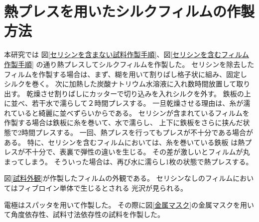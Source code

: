 \documentclass[dvipdfmx,12pt,a4paper]{jreport}
\begin{document}
		\section{熱プレスを用いたシルクフィルムの作製方法}
		本研究では
		図\ref{セリシンを含まない試料作製手順}、図\ref{セリシンを含むフィルム作製手順}
		の通り熱プレスしてシルクフィルムを作製した。
		セリシンを除去したフィルムを作製する場合は、まず、糊を用いて割りばし格子状に組み、固定し
		シルクを巻く。
		次に加熱した炭酸ナトリウム水溶液に入れ数時間放置して取り出す。
		乾燥させ割りばしにカッターで切り込みを入れシルクを外す。
		鉄板の上に並べ、若干水で濡らして２時間プレスする。
		一旦乾燥させる理由は、糸が濡れていると綺麗に並べずらいからである。
		セリシンが含まれているフィルムを作製する場合は鉄板に糸を巻いて、水で濡らし、
		上下に鉄板をさらに挟んだ状態で2時間プレスする。
		一回、熱プレスを行ってもプレスが不十分である場合がある。
		特に、セリシンを含むフィルムにおいては、糸を巻いている鉄板
		は熱プレスが不十分で、表裏で弾性の違いを生じる。
		その差が激しいとフィルムが丸まってしまう。
		そういった場合は、再び水に濡らし1枚の状態で熱プレスする。

		図\ref{試料外観}が作製したフィルムの外観である。
		セリシンなしのフィルムにおいてはフィブロイン単体で生じるとされる
		光沢が見られる。

		電極はスパッタを用いて作製した。
		その際に図\ref{金属マスク}の金属マスクを用いて角度依存性、試料寸法依存性の試料を作製した。
\end{document}
